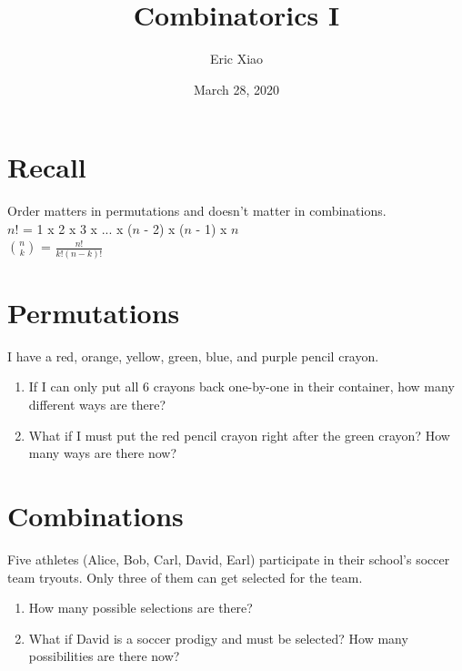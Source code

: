 \documentclass[11pt]{extarticle}
\title{Combinatorics I}
\author{Eric Xiao}
\date{March 28, 2020}
\begin{document}
\maketitle

\section{Recall}
\large{Order matters in permutations and doesn't matter in combinations.\\}
\large{$n!$ = 1 x 2 x 3 x ... x ($n$ - 2) x ($n$ - 1) x $n$\\}
\large{$\binom{n}{k}$ = $\frac{n!}{k!(n - k)!}$}

\section{Permutations}
{I have a red, orange, yellow, green, blue, and purple pencil crayon.}
\begin{enumerate}
    \itemsep 2.0em
    \item {If I can only put all 6 crayons back one-by-one in their container, how many different ways are there?}
    \item {What if I must put the red pencil crayon right after the green crayon? How many ways are there now?}
\end{enumerate}

\section{Combinations}
{Five athletes (Alice, Bob, Carl, David, Earl) participate in their school's soccer team tryouts. Only three of them can get selected for the team.}
\begin{enumerate}
    \itemsep 2.0em
    \item {How many possible selections are there?}
    \item {What if David is a soccer prodigy and must be selected? How many possibilities are there now?}
\end{enumerate}

\bigskip
\end{document}
